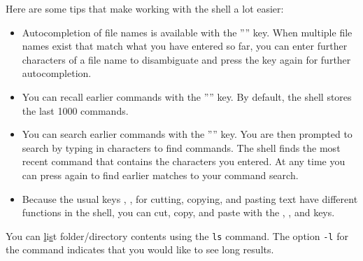 \begin{infobox}
Here are some tips that make working with the shell a lot easier:

\begin{itemize}
  \item Autocompletion of file names is available with the '''' key. When multiple file names exist that match what you have entered so far, you can enter further characters of a file name to disambiguate and press the  key again for further autocompletion. 
  \item You can recall earlier commands with the '''' key. By default, the shell stores the last 1000 commands.
  \item You can search earlier commands with the '''' key. You are then prompted to search by typing in characters to find commands. The shell finds the most recent command that contains the  characters you entered. At any time you can press  again to find earlier matches to your command search. 
  \item Because the usual keys , ,  for cutting, copying, and pasting text have different functions in the shell, you can cut, copy, and paste with the , , and  keys.
\end{itemize}
\end{infobox}

You can \underline{l}i\underline{s}t folder/directory contents using the \texttt{ls} command. The option \texttt{-l} for the command indicates that you would like to see long results. 

\scriptsize
{}
\normalsize

